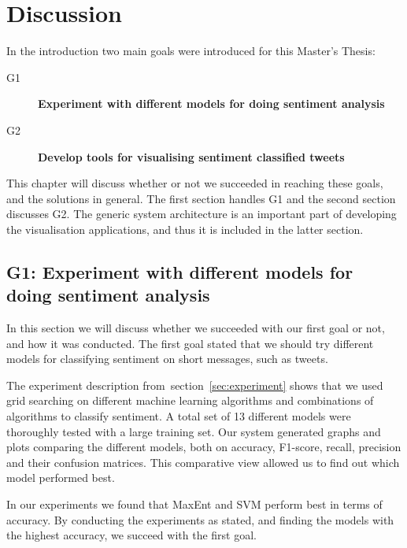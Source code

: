 \chapter{Discussion}

In the introduction two main goals were introduced for this Master's Thesis:

\begin{description}

\item[G1] \textbf{Experiment with different models for doing sentiment analysis}
	
\item[G2] \textbf{Develop tools for visualising sentiment classified tweets}

\end{description}

This chapter will discuss whether or not we succeeded in reaching these goals, and the solutions in general. The first section handles G1 and the second section discusses G2. The generic system architecture is an important part of developing the visualisation applications, and thus it is included in the latter section.

\section{G1: Experiment with different models for doing sentiment analysis}

In this section we will discuss whether we succeeded with our first goal or not, and how it was conducted. The first goal stated that we should try different models for classifying sentiment on short messages, such as tweets. 

The experiment description from~section~\ref{sec:experiment} shows that we used grid searching on different machine learning algorithms and combinations of algorithms to classify sentiment. A total set of 13 different models were thoroughly tested with a large training set. Our system generated graphs and plots comparing the different models, both on accuracy, F1-score, recall, precision and their confusion matrices. This comparative view allowed us to find out which model performed best.

In our experiments we found that MaxEnt and SVM perform best in terms of accuracy. By conducting the experiments as stated, and finding the models with the highest accuracy, we succeed with the first goal.

